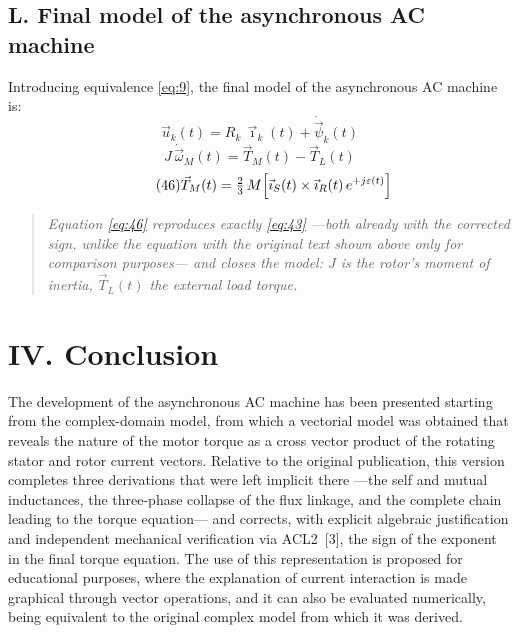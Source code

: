 \documentclass[11pt,a4paper]{article}
\begin{document}
\subsection*{L. Final model of the asynchronous AC machine}

Introducing equivalence \eqref{eq:9}, the final model of the asynchronous AC machine is:
\begin{equation}\tag{44}\label{eq:44}
\vec u_k(t) = R_k\,\vec\imath_k(t) + \dot{\vec\psi}_k(t)
\end{equation}
\begin{equation}\tag{45}\label{eq:45}
J\,\dot{\vec\omega}_M(t) = \vec T_M(t) - \vec T_L(t)
\end{equation}
\begin{equation}\tag{46}\label{eq:46}
\vec T_M(t) = \tfrac23\,M\Bigl[\vec\imath_S(t)\times\vec\imath_R(t)\,e^{+j\varepsilon(t)}\Bigr]
\end{equation}

\begin{quote}\emph{Equation \eqref{eq:46} reproduces exactly \eqref{eq:43} ---both already with the corrected sign, unlike the equation with the original text shown above only for comparison purposes--- and closes the model: $J$ is the rotor's moment of inertia, $\vec T_L(t)$ the external load torque.}\end{quote}

\section*{IV. Conclusion}

The development of the asynchronous AC machine has been presented starting from the complex-domain model, from which a vectorial model was obtained that reveals the nature of the motor torque as a cross vector product of the rotating stator and rotor current vectors. Relative to the original publication, this version completes three derivations that were left implicit there ---the self and mutual inductances, the three-phase collapse of the flux linkage, and the complete chain leading to the torque equation--- and corrects, with explicit algebraic justification and independent mechanical verification via ACL2~[3], the sign of the exponent in the final torque equation. The use of this representation is proposed for educational purposes, where the explanation of current interaction is made graphical through vector operations, and it can also be evaluated numerically, being equivalent to the original complex model from which it was derived.
\end{document}

